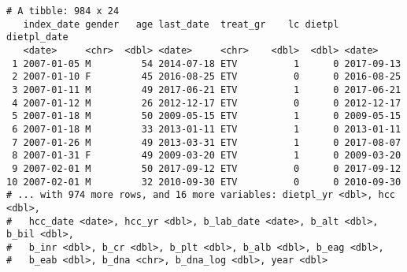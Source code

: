 \documentclass[
]{article}
\begin{document}
\begin{verbatim}
# A tibble: 984 x 24
   index_date gender   age last_date  treat_gr    lc dietpl dietpl_date
   <date>     <chr>  <dbl> <date>     <chr>    <dbl>  <dbl> <date>     
 1 2007-01-05 M         54 2014-07-18 ETV          1      0 2017-09-13 
 2 2007-01-10 F         45 2016-08-25 ETV          0      0 2016-08-25 
 3 2007-01-11 M         49 2017-06-21 ETV          1      0 2017-06-21 
 4 2007-01-12 M         26 2012-12-17 ETV          0      0 2012-12-17 
 5 2007-01-18 M         50 2009-05-15 ETV          1      0 2009-05-15 
 6 2007-01-18 M         33 2013-01-11 ETV          1      0 2013-01-11 
 7 2007-01-26 M         49 2013-03-31 ETV          1      0 2017-08-07 
 8 2007-01-31 F         49 2009-03-20 ETV          1      0 2009-03-20 
 9 2007-02-01 M         50 2017-09-12 ETV          0      0 2017-09-12 
10 2007-02-01 M         32 2010-09-30 ETV          0      0 2010-09-30 
# ... with 974 more rows, and 16 more variables: dietpl_yr <dbl>, hcc <dbl>,
#   hcc_date <date>, hcc_yr <dbl>, b_lab_date <date>, b_alt <dbl>, b_bil <dbl>,
#   b_inr <dbl>, b_cr <dbl>, b_plt <dbl>, b_alb <dbl>, b_eag <dbl>,
#   b_eab <dbl>, b_dna <chr>, b_dna_log <dbl>, year <dbl>
\end{verbatim}
\end{document}
